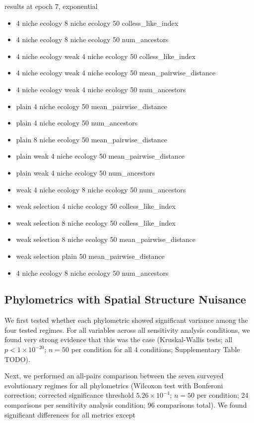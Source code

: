 results at epoch 7, exponential
    \begin{itemize}
        \item 4 niche ecology	8 niche ecology	50	colless_like_index
        \item 4 niche ecology	8 niche ecology	50	num_ancestors
        \item 4 niche ecology	weak 4 niche ecology	50	colless_like_index
        \item 4 niche ecology	weak 4 niche ecology	50	mean_pairwise_distance
        \item 4 niche ecology	weak 4 niche ecology	50	num_ancestors
        \item plain	4 niche ecology	50	mean_pairwise_distance
        \item plain	4 niche ecology	50	num_ancestors
        \item plain	8 niche ecology	50	mean_pairwise_distance
        \item plain	weak 4 niche ecology	50	mean_pairwise_distance
        \item plain	weak 4 niche ecology	50	num_ancestors
        \item weak 4 niche ecology	8 niche ecology	50	num_ancestors
        \item weak selection	4 niche ecology	50	colless_like_index
        \item weak selection	8 niche ecology	50	colless_like_index
        \item weak selection	8 niche ecology	50	mean_pairwise_distance
        \item weak selection	plain	50	mean_pairwise_distance
        \item 4 niche ecology	8 niche ecology	50	num_ancestors

    \end{itemize}
\subsection{Phylometrics with Spatial Structure Nuisance}

We first tested whether each phylometric showed significant variance among the four tested regimes. For all variables across all sensitivity analysis conditions, we found very strong evidence that this was the case (Kruskal-Wallis tests; all $p < 1\times10^{-20}$; $n=50$ per condition for all 4 conditions; Supplementary Table TODO).

Next, we performed an all-pairs comparison between the seven surveyed evolutionary regimes for all phylometrics (Wilcoxon test with Bonferoni correction; corrected significance threshold $5.26 \times 10^{-4}$; $n=50$ per condition; 24 comparisons per sensitivity analysis condition; 96 comparisons total). We found significant differences for all metrics except

